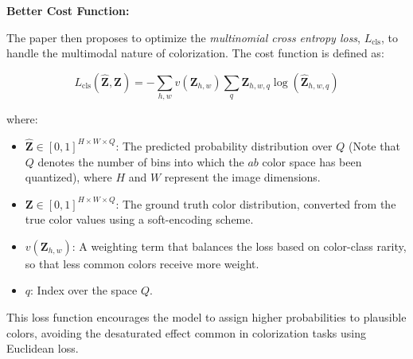 \documentclass{article}
\begin{document}
\begin{enumerate}
\textbf{Better Cost Function:}

The paper then proposes to optimize the \textit{multinomial cross entropy loss}, $L_{\text{cls}}$, to handle the multimodal nature of colorization. The cost function is defined as:

\[
L_{\text{cls}}(\hat{\mathbf{Z}}, \mathbf{Z}) = - \sum_{h,w} v(\mathbf{Z}_{h,w}) \sum_q \mathbf{Z}_{h,w,q} \log (\hat{\mathbf{Z}}_{h,w,q})
\]

where:
\begin{itemize}
    \item $\hat{\mathbf{Z}} \in [0, 1]^{H \times W \times Q}$: The predicted probability distribution over $Q$ (Note that $Q$ denotes the number of bins into which the $ab$ color space has been quantized), where $H$ and $W$ represent the image dimensions.
    \item $\mathbf{Z} \in [0, 1]^{H \times W \times Q}$: The ground truth color distribution, converted from the true color values using a soft-encoding scheme.
    \item $v(\mathbf{Z}_{h,w})$: A weighting term that balances the loss based on color-class rarity, so that less common colors receive more weight.
    \item $q$: Index over the space $Q$.
\end{itemize}

This loss function encourages the model to assign higher probabilities to plausible colors, avoiding the desaturated effect common in colorization tasks using Euclidean loss.

\end{enumerate}
\end{document}
